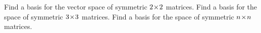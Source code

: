 
\begin{Exercise}[
name={},
title={}, 
difficulty=0,
origin={\cite{JH}}]
\Question Find a basis for the vector space of
        symmetric \( 2 \! \times \! 2 \) matrices.
\Question Find a basis for the space of symmetric \( 3 \! \times \! 3 \)
        matrices.
\Question Find a basis for the space of symmetric \( n \! \times \! n \)
        matrices.
\end{Exercise}

